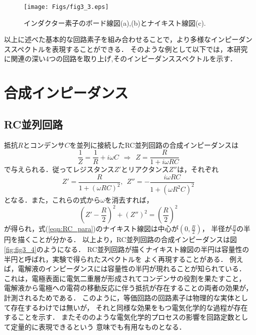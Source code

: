 \begin{figure}[h]
	\begin{center}
	\texttt{[image: Figs/fig3\_3.eps]} 
	\end{center}
	\caption{
		インダクター素子のボード線図(a),(b)とナイキスト線図(c).
	} 
	\label{fig:fig3_3}
\end{figure}
以上に述べた基本的な回路素子を組み合わせることで，より多様なインピーダンススペクトルを表現することができる．
そのような例として以下では，本研究に関連の深い4つの回路を取り上げ,そのインピーダンススペクトルを示す．
\section{合成インピーダンス}
\subsection{RC並列回路}
抵抗$R$とコンデンサ$C$を並列に接続したRC並列回路の合成インピーダンスは
\begin{equation}
	\frac{1}{Z}=\frac{1}{R} + i\omega C \ \ 
	\Rightarrow \ \ Z =\frac{R}{1+i\omega RC}
	\label{eqn:RC_para}
\end{equation}
で与えられる．従ってレジスタンス$Z'$とリアクタンス$Z''$は，それぞれ
\begin{equation}
	Z'=\frac{R}{1+(\omega RC)^2}, \ \ 
	Z''=-\frac{i\omega RC}{1+(\omega R^2C)^2} 
	\label{eqn:}
\end{equation}
となる．また，これらの式から$\omega$を消去すれば，
\begin{equation}
	\left( Z'-\frac{R}{2}\right)^2 +\left(Z''\right)^2 =\left( \frac{R}{2}\right)^2
	\label{eqn:}
\end{equation}
が得られ，式(\ref{eqn:RC_para})のナイキスト線図は中心が$\left( 0, \frac{R}{2}\right)$，
半径が$\frac{R}{2}$の半円を描くことが分かる．
以上より，RC並列回路の合成インピーダンスは図\ref{fig:fig3_4}のようになる．
RC並列回路が描くナイキスト線図の半円は容量性の半円と呼ばれ，実験で得られたスペクトルを
よく再現することがある．
例えば，電解液のインピーダンスには容量性の半円が現れることが知られている．
これは，電極表面に電気二重層が形成されてコンデンサの役割を果たすこと，
電解液から電極への電荷の移動反応に伴う抵抗が存在することの両者の効果が，
計測されるためである．
このように，等価回路の回路素子は物理的な実体として存在するわけでは無いが，
それと同様な効果をもつ電気化学的な過程が存在することを示す．
またそののような電気化学的プロセスの影響を回路定数として定量的に表現できるという
意味でも有用なものとなる．

